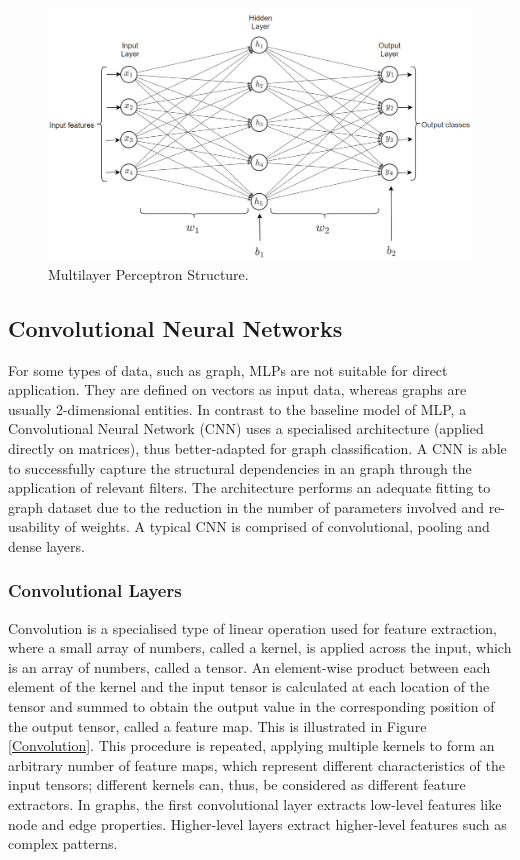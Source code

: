 \begin{figure}[H]
  \centering
  \includegraphics[scale = 0.35]{Images/mlp.png}
  \caption{Multilayer Perceptron Structure.}
  \label{Multilayer Perceptron}
\end{figure}

\subsection{Convolutional Neural Networks}

For some types of data, such as graph, MLPs are not suitable for direct application. They are defined on vectors as input data, whereas graphs are usually 2-dimensional entities. In contrast to the baseline model of MLP, a Convolutional Neural Network (CNN) uses a specialised architecture (applied directly on matrices), thus better-adapted for graph classification. A CNN is able to successfully capture the structural dependencies in an graph through the application of relevant filters. The architecture performs an adequate fitting to graph dataset due to the reduction in the number of parameters involved and re-usability of weights. A typical CNN is comprised of convolutional, pooling and dense layers. 

\subsubsection*{Convolutional Layers}

Convolution is a specialised type of linear operation used for feature extraction, where a small array of numbers, called a kernel, is applied across the input, which is an array of numbers, called a tensor. An element-wise product between each element of the kernel and the input tensor is calculated at each location of the tensor and summed to obtain the output value in the corresponding position of the output tensor, called a feature map. This is illustrated in Figure \ref{Convolution}. This procedure is repeated, applying multiple kernels to form an arbitrary number of feature maps, which represent different characteristics of the input tensors; different kernels can, thus, be considered as different feature extractors. In graphs, the first convolutional layer extracts low-level features like node and edge properties. Higher-level layers extract higher-level features such as complex patterns. 

